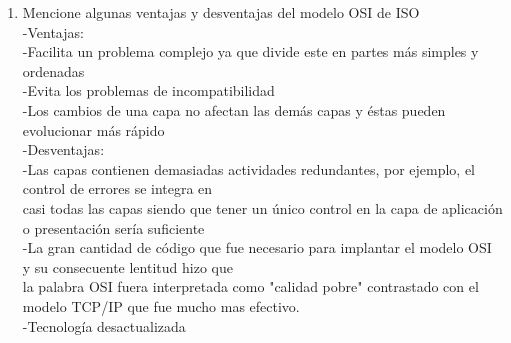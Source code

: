 \documentclass{udparticle}
\begin{document}
\begin{enumerate}
\item Mencione algunas ventajas y desventajas del modelo OSI de ISO\\
    -Ventajas:\\
        -Facilita un problema complejo ya que divide este en partes más simples y ordenadas\\
        -Evita los problemas de incompatibilidad\\
        -Los cambios de una capa no afectan las demás capas y éstas pueden evolucionar más rápido\\
    -Desventajas:\\
        -Las capas contienen demasiadas actividades redundantes, por ejemplo, el control de errores se integra en \\
         casi todas las capas siendo que tener un único control en la capa de aplicación o presentación sería suficiente\\
        -La gran cantidad de código que fue necesario para implantar el modelo OSI y su consecuente lentitud hizo que \\
         la palabra OSI fuera interpretada como "calidad pobre" contrastado con el modelo TCP/IP que fue mucho mas efectivo.\\
        -Tecnología desactualizada\\
        

\end{enumerate}
\end{document}
